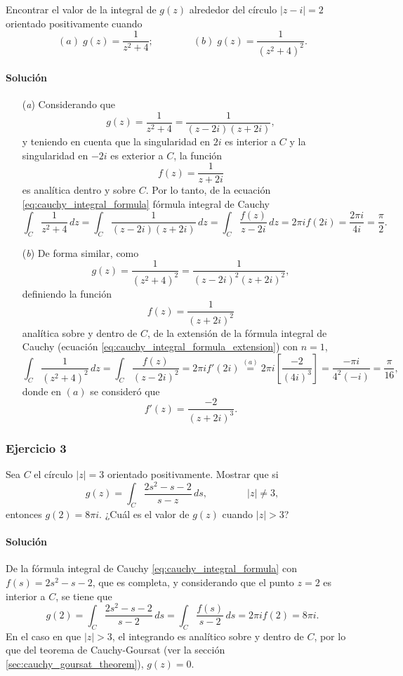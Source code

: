 \documentclass[a4paper]{report}
\begin{document}
Encontrar el valor de la integral de \(g(z)\) alrededor del círculo \(|z-i|=2\) orientado positivamente cuando 
\[
 (\textit{a})\;g(z)=\frac{1}{z^2+4};\qquad\qquad 
 (\textit{b})\;g(z)=\frac{1}{(z^2+4)^2}.
\]

\paragraph{Solución}
\begin{enumerate}
 \item[(\textit{a})] Considerando que 
 \[
  g(z)=\frac{1}{z^2+4}=\frac{1}{(z-2i)(z+2i)},
 \]
 y teniendo en cuenta que la singularidad en \(2i\) es interior a \(C\) y la singularidad en \(-2i\) es exterior a \(C\), la función 
 \[
  f(z)=\frac{1}{z+2i}
 \]
 es analítica dentro y sobre \(C\). Por lo tanto, de la ecuación \ref{eq:cauchy_integral_formula} fórmula integral de Cauchy
 \[
  \int_C\frac{1}{z^2+4}\,dz=\int_C\frac{1}{(z-2i)(z+2i)}\,dz=\int_C\frac{f(z)}{z-2i}\,dz=2\pi if(2i)=\frac{2\pi i}{4i}=\frac{\pi}{2}.
 \]
 \item[(\textit{b})] De forma similar, como
 \[
  g(z)=\frac{1}{(z^2+4)^2}=\frac{1}{(z-2i)^2(z+2i)^2},  
 \]
 definiendo la función 
 \[
  f(z)=\frac{1}{(z+2i)^2}
 \]
 analítica sobre y dentro de \(C\), de la extensión de la fórmula integral de Cauchy (ecuación \ref{eq:cauchy_integral_formula_extension}) con \(n=1\),
 \[
  \int_C\frac{1}{(z^2+4)^2}\,dz=\int_C\frac{f(z)}{(z-2i)^2}=2\pi if'(2i)
  \overset{(a)}{=}2\pi i\left[\frac{-2}{(4i)^3}\right]=\frac{-\pi i}{4^2(-i)}=\frac{\pi}{16},
 \]
 donde en \((a)\) se consideró que 
 \[
  f'(z)=\frac{-2}{(z+2i)^3}.
 \]
\end{enumerate}

\subsubsection*{Ejercicio 3}

Sea \(C\) el círculo \(|z|=3\) orientado positivamente. Mostrar que si
\[
 g(z)=\int_C\frac{2s^2-s-2}{s-z}\,ds,
 \qquad\qquad
 |z|\neq3,
\]
entonces \(g(2)=8\pi i\). ¿Cuál es el valor de \(g(z)\) cuando \(|z|>3\)?

\paragraph{Solución} De la fórmula integral de Cauchy \ref{eq:cauchy_integral_formula} con \(f(s)=2s^2-s-2\), que es completa, y considerando que el punto \(z=2\) es interior a \(C\), se tiene que 
\[
 g(2)=\int_C\frac{2s^2-s-2}{s-2}\,ds=\int_C\frac{f(s)}{s-2}\,ds=2\pi if(2)=8\pi i.
\]
En el caso en que \(|z|>3\), el integrando es analítico sobre y dentro de \(C\), por lo que del teorema de Cauchy-Goursat (ver la sección \ref{sec:cauchy_goursat_theorem}), \(g(z)=0\).
\end{document}
